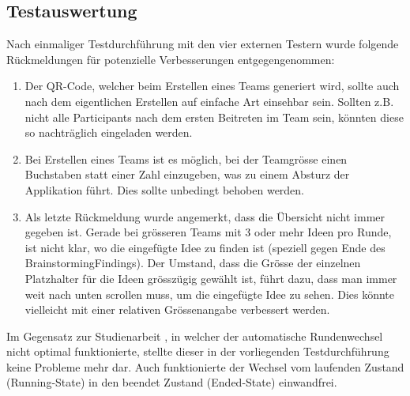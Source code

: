 \subsection{Testauswertung}
Nach einmaliger Testdurchführung mit den vier externen Testern wurde folgende Rück\-mel\-dun\-gen für potenzielle Verbesserungen entgegengenommen:

\begin{enumerate}
	\item Der QR-Code, welcher beim Erstellen eines Teams generiert wird, sollte auch nach dem eigentlichen Erstellen auf einfache Art einsehbar sein. Sollten z.B. nicht alle Participants nach dem ersten Beitreten im Team sein, könnten diese so nachträglich eingeladen werden.
	\item Bei Erstellen eines Teams ist es möglich, bei der Teamgrösse einen Buchstaben statt einer Zahl einzugeben, was zu einem Absturz der Applikation führt. Dies sollte unbedingt behoben werden.
	\item Als letzte Rückmeldung wurde angemerkt, dass die Übersicht nicht immer gegeben ist. Gerade bei grösseren Teams mit 3 oder mehr Ideen pro Runde, ist nicht klar, wo die eingefügte Idee zu finden ist (speziell gegen Ende des BrainstormingFindings). Der Umstand, dass die Grösse der einzelnen Platzhalter für die Ideen grösszügig gewählt ist, führt dazu, dass man immer weit nach unten scrollen muss, um die eingefügte Idee zu sehen. Dies könnte vielleicht mit einer relativen Grössenangabe verbessert werden.
\end{enumerate}

Im Gegensatz zur Studienarbeit \cite{methode635-sa} , in welcher der automatische Rundenwechsel nicht optimal funktionierte, stellte dieser in der vorliegenden Testdurchführung keine Probleme mehr dar. Auch funktionierte der Wechsel vom laufenden Zustand (Running-State) in den beendet Zustand (Ended-State) einwandfrei.


